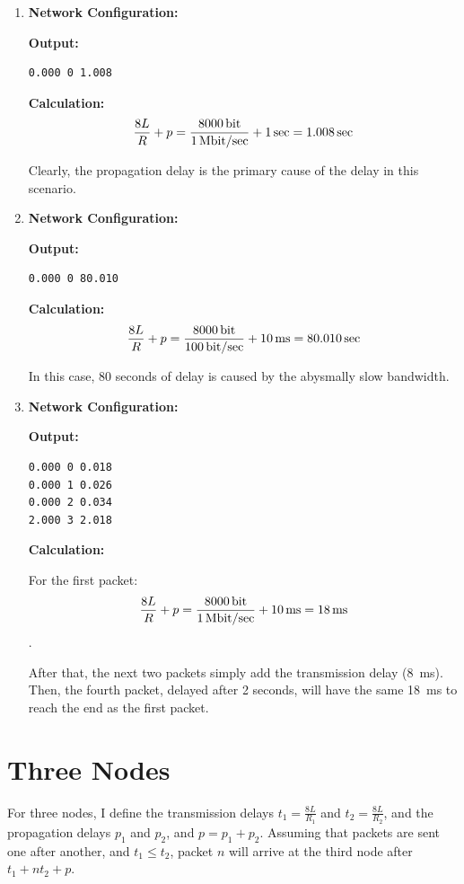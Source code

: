 \documentclass[fleqn,11pt]{article}
\begin{document}
\begin{enumerate}
\itemsep2em
\item
\textbf{Network Configuration:}


\textbf{Output:}
\begin{verbatim}
0.000 0 1.008
\end{verbatim}

\textbf{Calculation:}
\[
\dfrac{8L}{R} + p =
\dfrac{\SI{8000}{\bit}}{\SI{1}{\mega\bit\per\sec}} + \SI{1}{\sec} =
\SI{1.008}{\sec}
\]

Clearly, the propagation delay is the primary cause of the delay in this scenario.

\item
\textbf{Network Configuration:}


\textbf{Output:}
\begin{verbatim}
0.000 0 80.010
\end{verbatim}

\textbf{Calculation:}
\[
\dfrac{8L}{R} + p =
\dfrac{\SI{8000}{\bit}}{\SI{100}{\bit\per\sec}} + \SI{10}{\ms} =
\SI{80.010}{\sec}
\]

In this case, 80 seconds of delay is caused by the abysmally slow bandwidth.

\item
\textbf{Network Configuration:}


\textbf{Output:}
\begin{verbatim}
0.000 0 0.018
0.000 1 0.026
0.000 2 0.034
2.000 3 2.018
\end{verbatim}

\textbf{Calculation:}

For the first packet:
\[
\dfrac{8L}{R} + p =
\dfrac{\SI{8000}{\bit}}{\SI{1}{\mega\bit\per\sec}} + \SI{10}{\ms} =
\SI{18}{\ms}
\].

After that, the next two packets simply add the transmission delay (\SI{8}{\ms}).
Then, the fourth packet, delayed after 2 seconds, will have the same \SI{18}{\ms} to reach the end as the first packet.

\end{enumerate}

\section{Three Nodes}
For three nodes, I define the transmission delays $ t_1 = \frac{8L}{R_1} $ and $ t_2 = \frac{8L}{R_2} $, and the propagation delays $ p_1 $ and $ p_2 $, and $ p = p_1 + p_2 $.
Assuming that packets are sent one after another, and $ t_1 \leq t_2 $,
packet $ n $ will arrive at the third node after
$ t_1 + n t_2 + p $.
\end{document}
